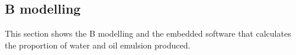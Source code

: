 \documentclass[11pt]{article} %
\begin{document}
% 
% 
% 
% 

\subsection{B modelling} 
\label{sec:Bmodel_case_study}

%
 


This section shows the B modelling and the embedded software that calculates the
proportion of water and oil emulsion produced.
\end{document}
